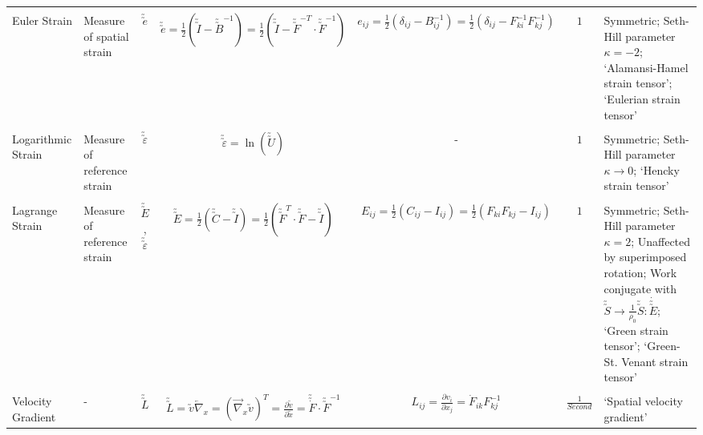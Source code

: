 \documentclass[10pt]{article}
\newcommand{\tu}[1]{\utilde{#1}}
\newcommand{\tuu}[1]{\utilde{\utilde{#1}}}
\begin{document}
\begin{center}
\begin{tabular}{l m{3in} c c c c m{5in}}
\hline
\\[-1ex]
Euler Strain
&%
Measure of spatial strain
&%
$ \tuu{e} $
&%
$ \tuu{e} = \frac{1}{2}(\tuu{I}-\tuu{B}^{-1})=\frac{1}{2}(\tuu{I}-\tuu{F}^{-T}\cdot\tuu{F}^{-1}) $
&%
$ e_{ij} = \frac{1}{2}(\delta_{ij} - B^{-1}_{ij}) = \frac{1}{2}(\delta_{ij} - F^{-1}_{ki} F^{-1}_{kj}) $
&%
$ 1 $
&%
Symmetric; Seth-Hill parameter $\kappa = -2$; `Alamansi-Hamel strain tensor'; `Eulerian strain tensor'
\\[1ex]

\hline
\\[-1ex]
Logarithmic Strain
&%
Measure of reference strain
&%
$ \tuu{\varepsilon} $
&%
$ \tuu{\varepsilon} = \ln(\tuu{U}) $
&%
-
&%
$ 1 $
&%
Symmetric; Seth-Hill parameter $\kappa \rightarrow 0$; `Hencky strain tensor'
\\[1ex]





\hline
\\[-1ex]
Lagrange Strain
&%
Measure of reference strain
&%
$ \tuu{E} $, $ \tuu{\varepsilon}$
&%
$ \tuu{E} = \frac{1}{2}(\tuu{C}-\tuu{I}) = \frac{1}{2}(\tuu{F}^{T}\cdot\tuu{F}-\tuu{I}) $
&%
$ E_{ij} = \frac{1}{2}(C_{ij} - I_{ij}) = \frac{1}{2}(F_{ki} F_{kj} - I_{ij}) $
&%
$ 1 $
&%
Symmetric; Seth-Hill parameter $\kappa = 2$; Unaffected by superimposed rotation; Work conjugate with $\tuu{S} \rightarrow \frac{1}{\rho_0}\tuu{S}\colon\dot{\tuu{E}}$; `Green strain tensor'; `Green-St. Venant strain tensor'
\\[1ex]

\hline
\\[-1ex]
Velocity Gradient
&%
-
&%
$ \tuu{L} $
&%
$ \tuu{L} = \tu{v}\overleftarrow{\nabla}_{x} = \left(\overrightarrow{\nabla}_{x}\tu{v}\right)^{T} = \frac{\partial \tu{v}}{\partial \tu{x}}= \tuu{\dot{F}}\cdot\tuu{F}^{-1} $
&%
$ L_{ij} = \frac{\partial v_{i}}{\partial x_{j}} = \dot{F}_{ik} F^{-1}_{kj} $
&%
$ \frac{1}{Second} $
&%
`Spatial velocity gradient'
\\[1ex]



\end{tabular}
\end{center}
\end{document}
